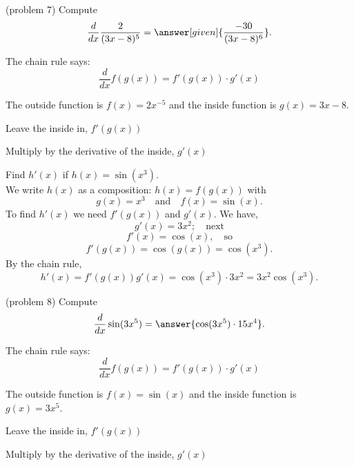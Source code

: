\documentclass{ximera}
\begin{document}
\begin{problem}(problem 7)
  Compute
  \[
  \frac{d}{dx} \frac{2}{(3x - 8)^5} = \answer[given]{\frac{-30}{(3x - 8)^6}}.
  \]
  
    \begin{hint}
      The chain rule says:
      \[
      \frac{d}{dx} f(g(x)) = f'(g(x))\cdot g'(x)
      \]
    \end{hint}
    \begin{hint}
      The outside function is $f(x) = 2x^{-5}$ and the inside
      function is $g(x) = 3x - 8$.
    \end{hint}
    
    \begin{hint}
		  Leave the inside in, $f'(g(x))$
		\end{hint}
		\begin{hint}
		  Multiply by the derivative of the inside, $g'(x)$
		\end{hint}
    
\end{problem}


\begin{example}[example 8]
Find $h'(x)$ if $h(x) = \sin(x^3)$.\\
We write $h(x)$ as a composition: $h(x)=f(g(x))$ with 
\[g(x) = x^3  \quad \text{and} \quad  f(x) = \sin(x).\] 
To find $h'(x)$ we need $f'(g(x))$ and $g'(x)$.  We have, 
\[g'(x) = 3x^2; \quad \text{next} \]
\[f'(x) =\cos(x) , \quad \text{so}\]
\[ f'(g(x)) = \cos(g(x)) = \cos(x^3).\]
By the chain rule,
\[h'(x) = f'(g(x))g'(x) = \cos(x^3)\cdot 3x^2 = 3x^2\cos(x^3).\]
\end{example}

\begin{center}
\begin{foldable}
\end{foldable}
\end{center}


\begin{problem}(problem 8)
  Compute
  \[
  \frac{d}{dx} \sin(3x^5) = \answer{\cos(3x^5)\cdot 15x^4}.
  \]
  
    \begin{hint}
      The chain rule says:
      \[
      \frac{d}{dx} f(g(x)) = f'(g(x))\cdot g'(x)
      \]
    \end{hint}
    \begin{hint}
      The outside function is $f(x) = \sin(x)$ and the inside
      function is $g(x) = 3x^5$.
    \end{hint}
    \begin{hint}
		  Leave the inside in, $f'(g(x))$
		\end{hint}
		\begin{hint}
		  Multiply by the derivative of the inside, $g'(x)$
		\end{hint}
    
\end{problem}
\end{document}
